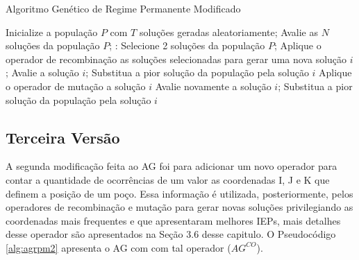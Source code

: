 \begin{algorithm}[H]
  \caption{Algoritmo Genético de Regime Permanente Modificado}
  \label{alg:agrpm}
  \begin{algorithmic}
    \State Inicialize a população $P$ com $T$ soluções geradas aleatoriamente;
    \State Avalie as $N$ soluções da população $P$;
       \State:
        \State Selecione 2 soluções da população $P$;
        \State Aplique o operador de recombinação as soluções selecionadas para gerar uma nova solução $i$;
        \State Avalie a solução $i$;
          \State Substitua a pior solução da população pela solução $i$	
        \Else
          \State Aplique o operador de mutação a solução $i$	
          \State Avalie novamente a solução $i$;
            \State Substitua a pior solução da população pela solução $i$
          \EndIf
        \EndIf
      \EndFor
    \EndWhile
  \end{algorithmic}
\end{algorithm}

\subsection{Terceira Versão}
\label{ch:3_TerceiraVersao}
A segunda modificação feita ao AG foi para adicionar um novo operador para contar a quantidade de ocorrências de um valor as coordenadas I, J e K que definem a posição de um poço. Essa informação é utilizada, posteriormente, pelos operadores de recombinação e mutação para gerar novas soluções privilegiando as coordenadas mais frequentes e que apresentaram melhores IEPs, mais detalhes desse operador são apresentados na Seção 3.6 desse capitulo. O Pseudocódigo \ref{alg:agrpm2} apresenta o AG com com tal operador ($AG^{CO}$).

